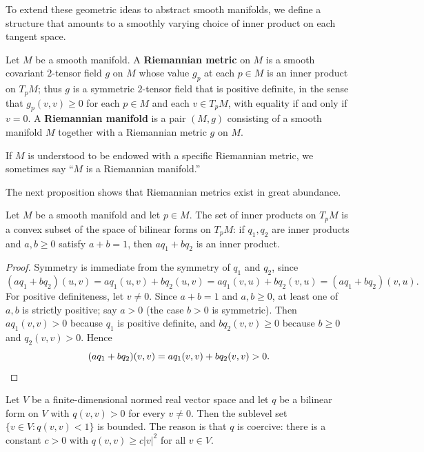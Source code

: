 To extend these geometric ideas to abstract smooth manifolds, we define a structure that amounts to a smoothly varying choice of inner product on each tangent space.

\begin{definition}
\label{def:riemannian-metric}
\leanok
Let $M$ be a smooth manifold. A \textbf{Riemannian metric} on $M$ is a smooth covariant $2$-tensor field $g$ on $M$ whose value $g_p$ at each $p \in M$ is an inner product on $T_p M$; thus $g$ is a symmetric $2$-tensor field that is positive definite, in the sense that $g_p(v,v) \geq 0$ for each $p \in M$ and each $v \in T_p M$, with equality if and only if $v = 0$. A \textbf{Riemannian manifold} is a pair $(M,g)$ consisting of a smooth manifold $M$ together with a Riemannian metric $g$ on $M$.
\end{definition}

If $M$ is understood to be endowed with a specific Riemannian metric, we sometimes say ``$M$ is a Riemannian manifold.''

The next proposition shows that Riemannian metrics exist in great abundance.

\begin{lemma}
\label{lem:convex-inner-products}
\leanok
Let $M$ be a smooth manifold and let $p \in M$. The set of inner products on $T_p M$ is a convex subset of the space of bilinear forms on $T_p M$: if $q_1, q_2$ are inner products and $a, b \geq 0$ satisfy $a + b = 1$, then $a q_1 + b q_2$ is an inner product.
\end{lemma}

\begin{proof}
\leanok
Symmetry is immediate from the symmetry of $q_1$ and $q_2$, since
\[
(a q_1 + b q_2)(u,v) = a q_1(u,v) + b q_2(u,v) = a q_1(v,u) + b q_2(v,u) = (a q_1 + b q_2)(v,u).
\]
For positive definiteness, let $v \neq 0$. Since $a + b = 1$ and $a, b \geq 0$, at least one of $a, b$ is strictly positive; say $a > 0$ (the case $b > 0$ is symmetric). Then $a q_1(v,v) > 0$ because $q_1$ is positive definite, and $b q_2(v,v) \geq 0$ because $b \geq 0$ and $q_2(v,v) > 0$. Hence
\[
(a q_1 + b q_2)(v,v) = a q_1(v,v) + b q_2(v,v) > 0. \qedhere
\]
\end{proof}

\begin{lemma}
\label{lem:posdef-coercive}
\leanok
Let $V$ be a finite-dimensional normed real vector space and let $q$ be a bilinear form on $V$ with $q(v,v) > 0$ for every $v \neq 0$. Then the sublevel set $\{v \in V : q(v,v) < 1\}$ is bounded. The reason is that $q$ is coercive: there is a constant $c > 0$ with $q(v,v) \geq c |v|^2$ for all $v \in V$.
\end{lemma}


